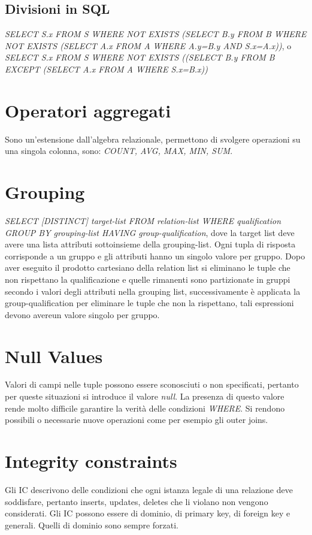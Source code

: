 \subsection{Divisioni in SQL}
\emph{SELECT S.x FROM S WHERE NOT EXISTS (SELECT B.y FROM B WHERE NOT EXISTS (SELECT A.x FROM A WHERE A.y=B.y AND S.x=A.x))}, o 
\emph{SELECT S.x FROM S WHERE NOT EXISTS ((SELECT B.y FROM B EXCEPT (SELECT A.x FROM A WHERE S.x=B.x))}
\section{Operatori aggregati}
Sono un'estensione dall'algebra relazionale, permettono di svolgere operazioni su una singola colonna, sono: \emph{COUNT, AVG, MAX, MIN, SUM}.
\section{Grouping}
\emph{SELECT [DISTINCT] target-list FROM relation-list WHERE qualification GROUP BY grouping-list HAVING group-qualification}, dove la target list deve 
avere una lista attributi sottoinsieme della grouping-list. Ogni tupla di risposta corrisponde a un gruppo e gli attributi hanno un singolo valore per 
gruppo. Dopo aver eseguito il prodotto cartesiano della relation list si eliminano le tuple che non rispettano la qualificazione e quelle rimanenti sono
partizionate in gruppi secondo i valori degli attributi nella grouping list, successivamente \`e applicata la group-qualification per eliminare le tuple
che non la rispettano, tali espressioni devono avereun valore singolo per gruppo.
\section{Null Values}
Valori di campi nelle tuple possono essere sconosciuti o non specificati, pertanto per queste situazioni si introduce il valore \emph{null}. La presenza di 
questo valore rende molto difficile garantire la verit\`a delle condizioni \emph{WHERE}. Si rendono possibili o necessarie nuove operazioni come per esempio
gli outer joins. 
\section{Integrity constraints}
Gli IC descrivono delle condizioni che ogni istanza legale di una relazione deve soddisfare, pertanto inserts, updates, deletes che li violano non vengono 
considerati. Gli IC possono essere di dominio, di primary key, di foreign key e generali. Quelli di dominio sono sempre forzati.
